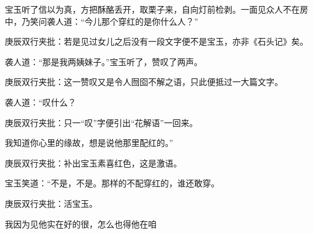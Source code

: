 \begin{parag}
    宝玉听了信以为真，方把酥酪丢开，取栗子来，自向灯前检剥。一面见众人不在房中，乃笑问袭人道：“今儿那个穿红的是你什么人？”\begin{note}庚辰双行夹批：若是见过女儿之后没有一段文字便不是宝玉，亦非《石头记》矣。\end{note}袭人道：“那是我两姨妹子。”宝玉听了，赞叹了两声。\begin{note}庚辰双行夹批：这一赞叹又是令人囫囵不解之语，只此便抵过一大篇文字。\end{note}袭人道：“叹什么？\begin{note}庚辰双行夹批：只一“叹”字便引出“花解语”一回来。\end{note}我知道你心里的缘故，想是说他那里配红的。”\begin{note}庚辰双行夹批：补出宝玉素喜红色，这是激语。\end{note}宝玉笑道：“不是，不是。那样的不配穿红的，谁还敢穿。\begin{note}庚辰双行夹批：活宝玉。\end{note}我因为见他实在好的很，怎么也得他在咱
\end{parag}

